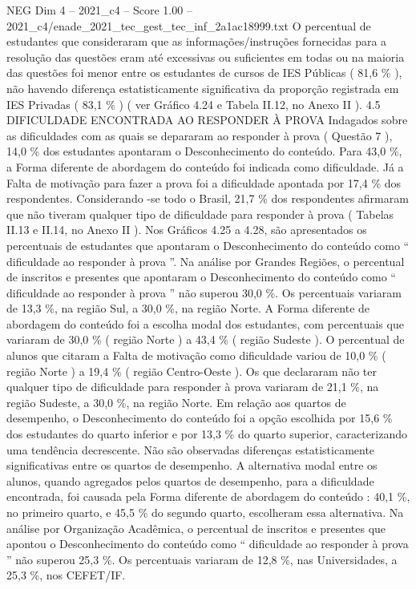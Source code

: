 \begin{textsample}{NEG Dim 4 – 2021\_c4 – Score 1.00 – 2021\_c4/enade\_2021\_tec\_gest\_tec\_inf\_2a1ac18999.txt}
O percentual de estudantes que consideraram que as informações/instruções fornecidas para a resolução das questões eram até excessivas ou suficientes em todas ou na maioria das questões foi menor entre os estudantes de cursos de IES Públicas ( 81,6 \% ), não havendo diferença estatisticamente significativa da proporção registrada em IES Privadas ( 83,1 \% ) ( ver Gráfico 4.24 e Tabela II.12, no Anexo II ). 4.5 DIFICULDADE ENCONTRADA AO RESPONDER À PROVA Indagados sobre as dificuldades com as quais se depararam ao responder à prova ( Questão 7 ), 14,0 \% dos estudantes apontaram o Desconhecimento do conteúdo.
Para 43,0 \%, a Forma diferente de abordagem do conteúdo foi indicada como dificuldade.
Já a Falta de motivação para fazer a prova foi a dificuldade apontada por 17,4 \% dos respondentes.
Considerando -se todo o Brasil, 21,7 \% dos respondentes afirmaram que não tiveram qualquer tipo de dificuldade para responder à prova ( Tabelas II.13 e II.14, no Anexo II ).
Nos Gráficos 4.25 a 4.28, são apresentados os percentuais de estudantes que apontaram o Desconhecimento do conteúdo como “ dificuldade ao responder à prova ”.
Na análise por Grandes Regiões, o percentual de inscritos e presentes que apontaram o Desconhecimento do conteúdo como “ dificuldade ao responder à prova ” não superou 30,0 \%.
Os percentuais variaram de 13,3 \%, na região Sul, a 30,0 \%, na região Norte.
A Forma diferente de abordagem do conteúdo foi a escolha modal dos estudantes, com percentuais que variaram de 30,0 \% ( região Norte ) a 43,4 \% ( região Sudeste ).
O percentual de alunos que citaram a Falta de motivação como dificuldade variou de 10,0 \% ( região Norte ) a 19,4 \% ( região Centro-Oeste ).
Os que declararam não ter qualquer tipo de dificuldade para responder à prova variaram de 21,1 \%, na região Sudeste, a 30,0 \%, na região Norte.
Em relação aos quartos de desempenho, o Desconhecimento do conteúdo foi a opção escolhida por 15,6 \% dos estudantes do quarto inferior e por 13,3 \% do quarto superior, caracterizando uma tendência decrescente.
Não são observadas diferenças estatisticamente significativas entre os quartos de desempenho.
A alternativa modal entre os alunos, quando agregados pelos quartos de desempenho, para a dificuldade encontrada, foi causada pela Forma diferente de abordagem do conteúdo : 40,1 \%, no primeiro quarto, e 45,5 \% do segundo quarto, escolheram essa alternativa.
Na análise por Organização Acadêmica, o percentual de inscritos e presentes que apontou o Desconhecimento do conteúdo como “ dificuldade ao responder à prova ” não superou 25,3 \%.
Os percentuais variaram de 12,8 \%, nas Universidades, a 25,3 \%, nos CEFET/IF.

\end{textsample}
